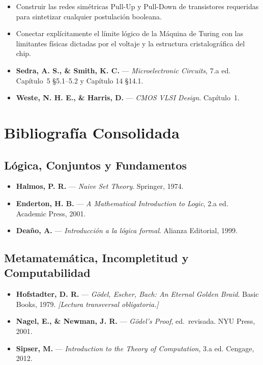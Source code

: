 \documentclass[11pt, letterpaper]{article}
\begin{document}
\begin{objetivos}
\begin{itemize}
  \item Construir las redes sim\'etricas Pull-Up y Pull-Down de transistores requeridas para sintetizar cualquier postulaci\'on booleana.
  \item Conectar expl\'icitamente el l\'imite l\'ogico de la M\'aquina de Turing con las limitantes f\'isicas dictadas por el voltaje y la estructura cristalogr\'afica del chip.
\end{itemize}
\end{objetivos}

\begin{lecturas}
\begin{itemize}
  \item[$(\star)$] \textbf{Sedra, A. S., \& Smith, K. C.} --- \emph{Microelectronic Circuits}, 7.a ed. Cap\'itulo~5 \S5.1--5.2 y Cap\'itulo 14 \S14.1.
  \item \textbf{Weste, N. H. E., \& Harris, D.} --- \emph{CMOS VLSI Design}. Cap\'itulo~1.
\end{itemize}
\end{lecturas}

\newpage

\section{Bibliograf\'ia Consolidada}

\subsection*{L\'ogica, Conjuntos y Fundamentos}
\begin{itemize}
  \item \textbf{Halmos, P. R.} --- \emph{Naive Set Theory}. Springer, 1974.
  \item \textbf{Enderton, H. B.} --- \emph{A Mathematical Introduction to Logic}, 2.a ed. Academic Press, 2001.
  \item \textbf{Deaño, A.} --- \emph{Introducci\'on a la l\'ogica formal}. Alianza Editorial, 1999.
\end{itemize}

\subsection*{Metamatem\'atica, Incompletitud y Computabilidad}
\begin{itemize}
  \item \textbf{Hofstadter, D. R.} --- \emph{G\"odel, Escher, Bach: An Eternal Golden Braid}. Basic Books, 1979. \textit{[Lectura transversal obligatoria.]}
  \item \textbf{Nagel, E., \& Newman, J. R.} --- \emph{G\"odel's Proof}, ed.\ revisada. NYU Press, 2001.
  \item \textbf{Sipser, M.} --- \emph{Introduction to the Theory of Computation}, 3.a ed. Cengage, 2012.
\end{itemize}
\end{document}
